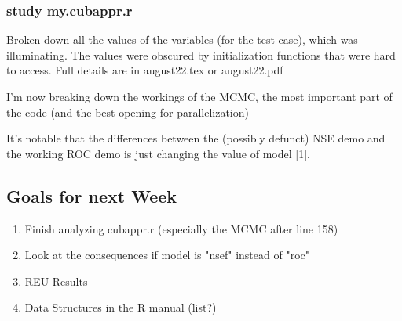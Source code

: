\documentclass[11pt]{article} %
\begin{document}
\subsubsection{study my.cubappr.r}
Broken down all the values of the variables (for the test case), which was illuminating. The values were obscured by initialization functions that were hard to access. Full details are in august22.tex or august22.pdf

I'm now breaking down the workings of the MCMC, the most important part of the code (and the best opening for parallelization)

It's notable that the differences between the (possibly defunct) NSE demo and the working ROC demo is just changing the value of model [1].

\subsection{Goals for next Week}
\begin{enumerate}
\item Finish analyzing cubappr.r (especially the MCMC after line 158)
\item Look at the consequences if model is "nsef" instead of "roc"
\item REU Results
\item Data Structures in the R manual (list?)
\end{enumerate}
\end{document}
